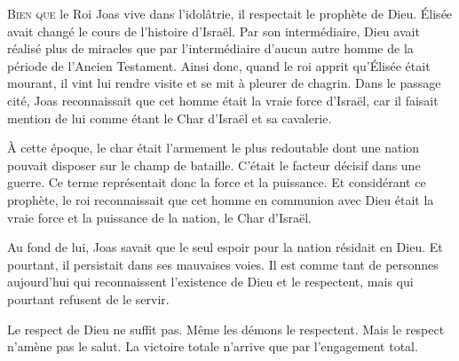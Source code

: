 \dvrule






\lettrine{B}{ien que} le Roi Joas vive dans l'idolâtrie,
 il respectait le prophète de Dieu.
 Élisée avait changé le cours de l'histoire d'Israël.
 Par son intermédiaire, Dieu avait réalisé plus de miracles
 que par l'intermédiaire d'aucun autre homme de la période
 de l'Ancien Testament.
 Ainsi donc, quand le roi apprit qu'Élisée était mourant,
 il vint lui rendre visite et se mit à pleurer de chagrin.
 Dans le passage cité, Joas reconnaissait que cet homme était
 la vraie force d'Israël, car il faisait mention de lui comme étant
 \Og le Char d'Israël et sa cavalerie. \Fg{}

À cette époque, le char était l'armement le plus redoutable
 dont une nation pouvait disposer sur le champ de bataille.
 C'était le facteur décisif dans une guerre.
 Ce terme représentait donc la force et la puissance.
 Et considérant ce prophète, le roi reconnaissait que cet homme
 en communion avec Dieu était la vraie force et la puissance
 de la nation, le \Og Char d'Israël. \Fg{}

Au fond de lui, Joas savait que le seul espoir pour la nation
 résidait en Dieu. Et pourtant, il persistait dans ses mauvaises voies.
 Il est comme tant de personnes aujourd'hui qui reconnaissent
 l'existence de Dieu et le respectent, mais qui pourtant refusent de le servir.


Le respect de Dieu ne suffit pas. Même les démons le respectent.
 Mais le respect n'amène pas le salut.
 La victoire totale n'arrive que par l'engagement total. 

\dvrule



